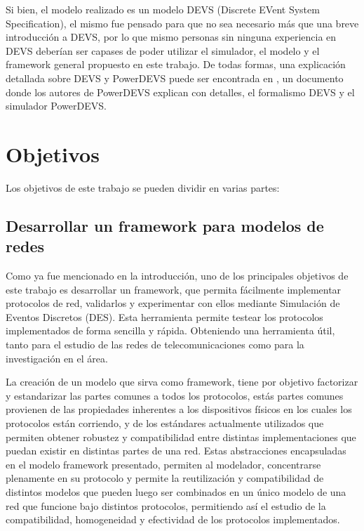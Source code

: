 \documentclass[10pt,a4paper]{article}
\begin{document}
Si bien, el modelo realizado es un modelo DEVS (Discrete EVent System Specification), el mismo fue pensado para que no sea necesario más que una breve introducción a DEVS, por lo que mismo personas sin ninguna experiencia en DEVS deberían ser capases de poder utilizar el simulador, el modelo y el framework general propuesto en este trabajo. De todas formas, una explicación detallada sobre DEVS y PowerDEVS puede ser encontrada en \cite{bergero2011powerdevs}, un documento donde los autores de PowerDEVS explican con detalles, el formalismo DEVS y el simulador PowerDEVS. \\

\section{Objetivos}

Los objetivos de este trabajo se pueden dividir en varias partes:
\subsection{Desarrollar un framework para modelos de redes}

Como ya fue mencionado en la introducción, uno de los principales objetivos de este trabajo es desarrollar un framework, que permita fácilmente implementar protocolos de red, validarlos y experimentar con ellos mediante Simulación de Eventos Discretos (DES). Esta herramienta permite testear los protocolos implementados de forma sencilla y rápida. Obteniendo una herramienta útil, tanto para el estudio de las redes de telecomunicaciones como para la investigación en el área. 

La creación de un modelo que sirva como framework, tiene por objetivo factorizar y estandarizar las partes comunes a todos los protocolos, estás partes comunes provienen de las propiedades inherentes a los dispositivos físicos en los cuales los protocolos están corriendo, y de los estándares actualmente utilizados que permiten obtener robustez y compatibilidad entre distintas implementaciones que puedan existir en distintas partes de una red. Estas abstracciones encapsuladas en el modelo framework presentado, permiten al modelador, concentrarse plenamente en su protocolo y permite la reutilización y compatibilidad de distintos modelos que pueden luego ser combinados en un único modelo de una red que funcione bajo distintos protocolos, permitiendo así el estudio de la compatibilidad, homogeneidad y efectividad de los protocolos implementados.
\end{document}
